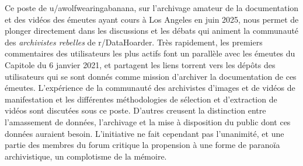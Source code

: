 Ce poste de u/awolfwearingabanana, sur l'archivage amateur de la documentation et des vidéos des émeutes ayant cours à Los Angeles en juin 2025, nous permet de plonger directement dans les discussions et les débats qui animent la communauté des \textit{archivistes rebelles} de r/DataHoarder.  Très rapidement, les premiers commentaires des utilisateurs les plus actifs font un parallèle avec les émeutes du Capitole du 6 janvier 2021, et partagent les liens torrent vers les dépôts des utilisateurs qui se sont donnés comme mission d'archiver la documentation de ces émeutes. L'expérience de la communauté des archivistes d'images et de vidéos de manifestation et les différentes méthodologies de sélection et d'extraction de vidéos sont discutées sous ce poste. D'autres creusent la distinction entre l'amassement de données, l'archivage et la mise à disposition du public dont ces données auraient besoin. L'initiative ne fait cependant pas l'unanimité, et une partie des membres du forum critique la propension à une forme de paranoïa archivistique, un complotisme de la mémoire. 

